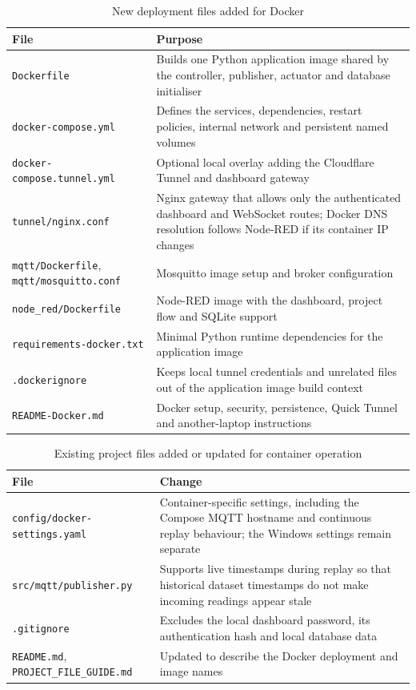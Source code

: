 \documentclass[12pt,a4paper,oneside]{report}
\begin{document}
\begin{table}[htbp]\centering\small
\caption{New deployment files added for Docker}\label{tab:docker-files}
\begin{tabular}{|p{}|p{}|}\hline
\textbf{File} & \textbf{Purpose} \\\hline
\texttt{Dockerfile} & Builds one Python application image shared by the controller, publisher, actuator and database initialiser \\\hline
\texttt{docker-compose.yml} & Defines the services, dependencies, restart policies, internal network and persistent named volumes \\\hline
\texttt{docker-compose.tunnel.yml} & Optional local overlay adding the Cloudflare Tunnel and dashboard gateway \\\hline
\texttt{tunnel/nginx.conf} & Nginx gateway that allows only the authenticated dashboard and WebSocket routes; Docker DNS resolution follows Node-RED if its container IP changes \\\hline
\texttt{mqtt/Dockerfile}, \texttt{mqtt/mosquitto.conf} & Mosquitto image setup and broker configuration \\\hline
\texttt{node\_red/Dockerfile} & Node-RED image with the dashboard, project flow and SQLite support \\\hline
\texttt{requirements-docker.txt} & Minimal Python runtime dependencies for the application image \\\hline
\texttt{.dockerignore} & Keeps local tunnel credentials and unrelated files out of the application image build context \\\hline
\texttt{README-Docker.md} & Docker setup, security, persistence, Quick Tunnel and another-laptop instructions \\\hline
\end{tabular}\end{table}

\begin{table}[htbp]\centering\small
\caption{Existing project files added or updated for container operation}\label{tab:docker-updated}
\begin{tabular}{|p{}|p{}|}\hline
\textbf{File} & \textbf{Change} \\\hline
\texttt{config/docker-settings.yaml} & Container-specific settings, including the Compose MQTT hostname and continuous replay behaviour; the Windows settings remain separate \\\hline
\texttt{src/mqtt/publisher.py} & Supports live timestamps during replay so that historical dataset timestamps do not make incoming readings appear stale \\\hline
\texttt{.gitignore} & Excludes the local dashboard password, its authentication hash and local database data \\\hline
\texttt{README.md}, \texttt{PROJECT\_FILE\_GUIDE.md} & Updated to describe the Docker deployment and image names \\\hline
\end{tabular}\end{table}
\end{document}

